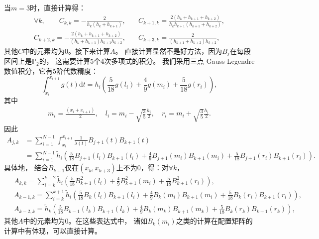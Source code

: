  当$m=3$时，直接计算得：
  \begin{align*}
    \forall k,\qquad
    C_{k,k}
    =-\frac{2}{h_{k}(h_{k}+h_{k+1})},&\quad
    C_{k+1,k}
    =\frac{2(h_{k}+h_{k+1}+h_{k+2})}{h_{k}h_{k+1}(h_{k+1}+h_{k+2})},\\
    C_{k+2,k}
    =-\frac{2(h_{k}+h_{k+1}+h_{k+2})}{(h_{k}+h_{k+1})h_{k+1}h_{k+2}},&\quad
    C_{k+3,k}=\frac{2}{(h_{k+1}+h_{k+2})h_{k+2}},
  \end{align*}
  其他$C$中的元素均为$0$。接下来计算$A$。
  直接计算显然不是好方法，因为$B_{j}$在每段区间上是$\mathbb{P}_{2}$的，
  这需要计算5个4次多项式的积分。
  我们采用三点 Gauss-Legendre 数值积分，它有5阶代数精度：
  \begin{displaymath}
    \int_{x_{i}}^{x_{i+1}}g(t)\mathrm{d}t
    =h_{i}\left(
    \frac{5}{18}g\left( l_{i} \right)
    +\frac{4}{9}g(m_{i})
    +\frac{5}{18}g\left( r_{i} \right)
    \right),
  \end{displaymath}
  其中
  \begin{align*}
    m_{i}=\frac{(x_{i}+x_{i+1})}{2},\quad
    l_{i}=m_{i}-\sqrt{\frac{3}{5}}\frac{h_{i}}{2},\quad
    r_{i}=m_{i}+\sqrt{\frac{3}{5}}\frac{h_{i}}{2}.
  \end{align*}
  因此
  \begin{align*}
    A_{j,k}
    &=\sum_{i=1}^{N-1}\int_{x_{i}}^{x_{i+1}}\frac{1}{\lambda(t)}B_{j+1}(t)B_{k+1}(t)\\
    &=\sum_{i=1}^{N-1}\tilde{h}_{i}\left(
    \frac{5}{18}B_{j+1}(l_{i})B_{k+1}(l_{i})
   +\frac{4}{9}B_{j+1}(m_{i})B_{k+1}(m_{i})
     +\frac{5}{18}B_{j+1}(r_{i})B_{k+1}(r_{i})
    \right).
  \end{align*}
  具体地，
  结合$B_{k+1}$仅在$(x_{k},x_{k+3})$上不为0，得：对$\forall k$，
  \begin{align*}
    &\ A_{k,k}
    =\sum_{i=k}^{k+2}\tilde{h}_{i}\left(
      \frac{5}{18}B_{k+1}^{2}(l_{i}) 
      +\frac{4}{9}B_{k+1}^{2}(m_{i})
      +\frac{5}{18}B_{k+1}^{2}(r_{i})
      \right),\\
    &\ A_{k-1,k}
    =\sum_{i=k}^{k+1}\tilde{h}_{i}\left(
    \frac{5}{18}B_{k}(l_{i})B_{k+1}(l_{i})
     +\frac{4}{9}B_{k}(m_{i})B_{k+1}(m_{i})
     +\frac{5}{18}B_{k}(r_{i})B_{k+1}(r_{i})\right),\\
    &\
    A_{k-2,k}
    =\tilde{h}_{k}\left(
    \frac{5}{18}B_{k-1}(l_{k})B_{k+1}(l_{k}) 
    +\frac{4}{9}B_{k}(m_{k})B_{k+1}(m_{k})
    +\frac{5}{18}B_{k}(r_{k})B_{k+1}(r_{k})
    \right),
  \end{align*}
  其他$A$中的元素均为0。在这些表达式中，
  诸如$B_{k}(m_{i})$之类的计算在配置矩阵的计算中有体现，可以直接计算。

